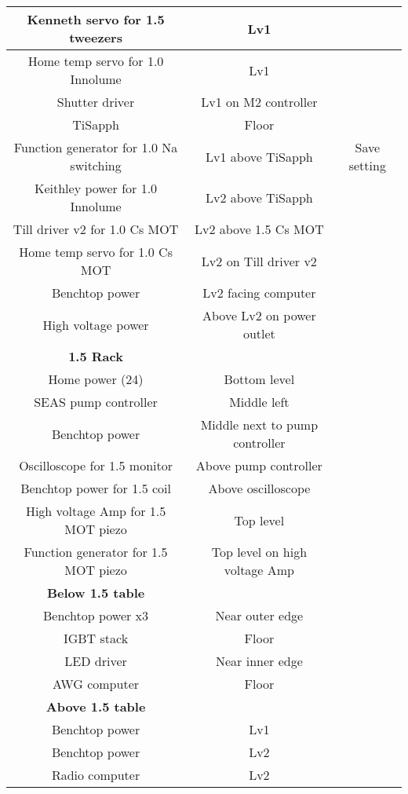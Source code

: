 \documentclass[10pt,fleqn,twocolumn]{article}
\begin{document}
\begin{longtable}{|c|c|c|}
  Kenneth servo for 1.5 tweezers&Lv1&\\\hline
  Home temp servo for 1.0 Innolume&Lv1&\\\hline
  Shutter driver&Lv1 on M2 controller&\\\hline
  TiSapph&Floor&\\\hline
  Function generator for 1.0 Na switching&Lv1 above TiSapph&Save setting\\\hline
  Keithley power for 1.0 Innolume&Lv2 above TiSapph&\\\hline
  Till driver v2 for 1.0 Cs MOT&Lv2 above 1.5 Cs MOT&\\\hline
  Home temp servo for 1.0 Cs MOT&Lv2 on Till driver v2&\\\hline
  Benchtop power&Lv2 facing computer&\\\hline
  High voltage power&Above Lv2 on power outlet&\\\hline
  \textbf{1.5 Rack}&&\\\hline
  Home power (24)&Bottom level&\\\hline
  SEAS pump controller&Middle left&\\\hline
  Benchtop power&Middle next to pump controller&\\\hline
  Oscilloscope for 1.5 monitor&Above pump controller&\\\hline
  Benchtop power for 1.5 coil&Above oscilloscope&\\\hline
  High voltage Amp for 1.5 MOT piezo&Top level&\\\hline
  Function generator for 1.5 MOT piezo&Top level on high voltage Amp&\\\hline
  \textbf{Below 1.5 table}&&\\\hline
  Benchtop power x3&Near outer edge&\\\hline
  IGBT stack&Floor&\\\hline
  LED driver&Near inner edge&\\\hline
  AWG computer&Floor&\\\hline
  \textbf{Above 1.5 table}&&\\\hline
  Benchtop power&Lv1&\\\hline
  Benchtop power&Lv2&\\\hline
  Radio computer&Lv2&\\\hline
\end{longtable}
\twocolumn
\end{document}
